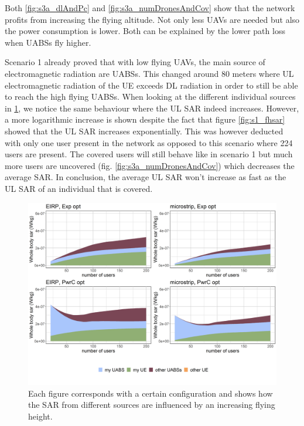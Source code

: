 Both  \ref{fig:s3a_dlAndPc} and \ref{fig:s3a_numDronesAndCov} show that the network profits from increasing the flying altitude. 
Not only less \gls{UAV}s are needed but also the power consumption is lower. Both can be explained by the lower path loss when \gls{UABS}s fly higher.

Scenario 1 already proved that with low flying \gls{UAV}s, the main source of electromagnetic radiation are \gls{UABS}s. 
This changed around 80 meters where \gls{UL} electromagnetic radiation of the \gls{UE}
exceeds \gls{DL} radiation in order to still be able to reach the high flying \gls{UABS}s. 
When looking at the different individual sources in \ref{fig:s3a_fourSourcesMatrix}, we notice the same behaviour where the 
 \gls{UL} \gls{SAR} indeed increases. However, a more logarithmic increase is shown
  despite the fact that figure \ref{fig:s1_fhsar} showed that the  \gls{UL} \gls{SAR} 
increases exponentially. This was however deducted with only one user present in the network as opposed to this scenario 
where 224 users are present. The covered users will still behave like in scenario 1 but much more users are uncovered (fig. \ref{fig:s3a_numDronesAndCov}) 
which decreases the average \gls{SAR}. 
In conclusion, the average  \gls{UL} \gls{SAR}  won't increase as fast as the \gls{UL} \gls{SAR} of 
an individual that is covered.

\begin{figure}[]
  \includegraphics[width=\textwidth]{../results/s3/fhFourSources.png}
  \caption{
  Each figure corresponds with a certain configuration and shows how the \gls{SAR} from different sources are influenced by an increasing flying height.}  
  \label{fig:s3a_fourSourcesMatrix}
\end{figure}

